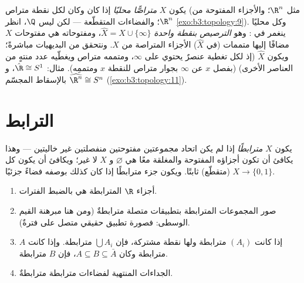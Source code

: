 \begin{definition}\label{def:b3:topology:locallycompact}
يكون $X$ \emph{متراصًّا محليًا} إذا كان
 وكان لكل نقطة  متراص (مثل $\R^n$؛ والأجزاء
المفتوحة من $\R^n$؛ والفضاءات المتقطّعة --- لكن ليس $\Q$، انظر
\cref{exo:b3:topology:9}). وكل  محليًا ينغمر في : وهو
\emph{الترصيص بنقطة واحدة} $\hat X = X
\cup \{\infty\}$،
ومفتوحاته هي مفتوحات $X$ مضافًا إليها متممات (في $\hat X$)
الأجزاء المتراصة من $X$. ونتحقق من البديهيات مباشرةً؛ ويكون
$\hat X$  (إذ لكل تغطية عنصرٌ يحتوي على $\infty$،
ومتممه متراص ويغطّيه عدد منتهٍ من العناصر الأخرى) 
(بفصل $x$ عن $\infty$ بجوار متراص للنقطة $x$ ومتممِه). مثال:
$\hat\R \cong S^1$، و $\widehat{\R^n} \cong S^n$ بالإسقاط المجسّم (\cref{exo:b3:topology:11}).
\end{definition}

\section{الترابط}

\begin{definition}\label{def:b3:topology:connected}
يكون $X$ \emph{مترابطًا} إذا لم يكن اتحاد
مجموعتين مفتوحتين منفصلتين غير خاليتين --- وهذا يكافئ أن تكون
أجزاؤه المفتوحة والمغلقة معًا هي $\varnothing$ و $X$ لا غير؛
ويكافئ أن يكون كل  $X \to \{0, 1\}$ (متقطّع) ثابتًا.
ويكون جزء مترابطًا إذا كان كذلك بوصفه فضاءً جزئيًا.
\end{definition}

\begin{theorem}\label{thm:b3:topology:connectedbasics}
\begin{enumerate}
  \item أجزاء $\R$ المترابطة هي بالضبط الفترات.
  \item صور المجموعات المترابطة بتطبيقات متصلة مترابطةٌ (ومن هنا
        مبرهنة القيم الوسطى: فصورة تطبيق حقيقي متصل على  فترةٌ).
  \item إذا كانت $(A_i)$ مترابطة ولها نقطة مشتركة، فإن $\bigcup
        A_i$
        مترابطة. وإذا كانت $A$ مترابطة وكان $A \subseteq
        B \subseteq \bar A$، فإن $B$
        مترابطة.
  \item الجداءات المنتهية لفضاءات مترابطة مترابطةٌ.
\end{enumerate}
\end{theorem}

